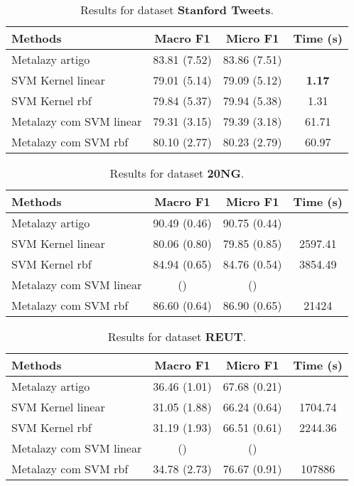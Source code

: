 \documentclass{article}
\begin{document}
	\begin{table}[ht]
		\small
		\centering	
		\begin{tabular}{l c c c}	
			\toprule
			\textbf{Methods} & \textbf{Macro F1} & \textbf{Micro F1} & \textbf{Time (s)} \\
			\midrule    
			Metalazy artigo & 83.81 (7.52) & 83.86 (7.51) & \\
			SVM Kernel linear & 79.01 (5.14) & 79.09 (5.12) & \textbf{1.17}\\
			SVM Kernel rbf &  79.84 (5.37) & 79.94 (5.38) & 1.31\\
			Metalazy com SVM linear & 79.31 (3.15)  & 79.39 (3.18) & 61.71 \\	
			Metalazy com SVM rbf & 80.10 (2.77) & 80.23 (2.79) & 60.97\\	
			\bottomrule 
		\end{tabular}
		\caption{Results for dataset \textbf{Stanford Tweets}.}
		\label{tab:dataset_Stanford Tweets}
	\end{table}

		\begin{table}[t]
		\small
		\centering	
		\begin{tabular}{l c c c}	
			\toprule
			\textbf{Methods} & \textbf{Macro F1} & \textbf{Micro F1} & \textbf{Time (s)} \\
			\midrule    
			Metalazy artigo &  90.49 (0.46) &  90.75 (0.44) & \\
			SVM Kernel linear &  80.06 (0.80)  &  79.85 (0.85) & 2597.41 \\
			SVM Kernel rbf &  84.94 (0.65) &  84.76 (0.54) & 3854.49 \\
			Metalazy com SVM linear &   ()  &   () &  \\	
			Metalazy com SVM rbf & 86.60 (0.64)  & 86.90 (0.65) & 21424\\	
			\bottomrule 
		\end{tabular}
		\caption{Results for dataset \textbf{20NG}.}
		\label{tab:dataset_20NG}
	\end{table}



	\begin{table}[t]
		\small
		\centering	
		\begin{tabular}{l c c c}	
			\toprule
			\textbf{Methods} & \textbf{Macro F1} & \textbf{Micro F1} & \textbf{Time (s)} \\
			\midrule    
			Metalazy artigo &  36.46 (1.01) &  67.68 (0.21) & \\
			SVM Kernel linear & 31.05 (1.88) & 66.24 (0.64) & 1704.74\\
			SVM Kernel rbf &  31.19 (1.93) & 66.51 (0.61) & 2244.36\\
			Metalazy com SVM linear &  ()  &  () &  \\	
			Metalazy com SVM rbf & 34.78 (2.73)  & 76.67 (0.91) & 107886\\	
			\bottomrule 
		\end{tabular}
		\caption{Results for dataset \textbf{REUT}.}
		\label{tab:dataset_reut}
	\end{table}
\end{document}
